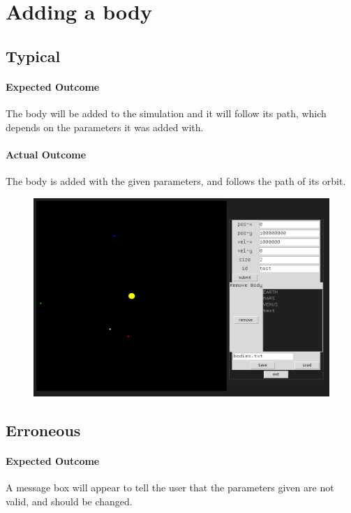 \section{Adding a body}
\subsection{Typical}
\paragraph{Expected Outcome}
The body will be added to the simulation and it will follow its path, which
depends on the parameters it was added with.
\paragraph{Actual Outcome}
The body is added with the given parameters, and follows the path of its orbit.
\begin{figure}[H]
	\includegraphics[width=\textwidth]{./img/add1.png}
\end{figure}

\subsection{Erroneous}
\paragraph{Expected Outcome}
A message box will appear to tell the user that the parameters given are not
valid, and should be changed.
